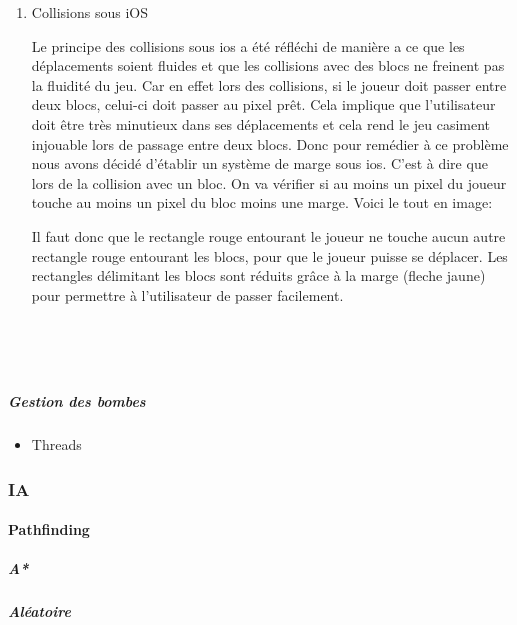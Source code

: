 {\begin{enumerate}
\begin{enumerate}
				  		\end{enumerate}

				  
				  \item Collisions sous iOS
				
				Le principe des collisions sous \gls{ios} a été réfléchi de manière a ce que les
				déplacements soient fluides et que les collisions avec des blocs ne
				freinent pas la fluidité du jeu. Car en effet lors des collisions, 
				si le joueur doit passer entre deux blocs, 
				celui-ci doit passer au pixel prêt. Cela implique que l'utilisateur doit
				être très minutieux dans ses déplacements et cela rend le jeu casiment
				injouable lors de passage entre deux blocs. 
				Donc pour remédier à ce problème nous avons décidé d'établir un système de marge sous \gls{ios}.
				C'est à dire que lors de la collision avec un bloc. 
				On va vérifier si au moins un pixel du joueur touche au moins un pixel du
				bloc moins une marge. 
				Voici le tout en image:

				Il faut donc que le rectangle rouge entourant 
				le joueur ne touche aucun autre rectangle rouge entourant
				les blocs, pour que le joueur puisse se déplacer. Les rectangles délimitant
				les blocs sont réduits grâce à la marge (fleche jaune) pour permettre à
				l'utilisateur de passer facilement.
				
				$\,$
				  		
				\begin{center}						
				\end{center}
						
				$\,$	
				
				
				\end{enumerate}
			
			\subparagraph{Gestion des bombes}
				\begin{itemize}
					\item{Threads}
				\end{itemize}
	
	\subsubsection{IA}
	
		\hypertarget{IA}{}
		\label{IA}
		
		\paragraph{Pathfinding}
			\subparagraph{A*}
			\subparagraph{Aléatoire}
}
